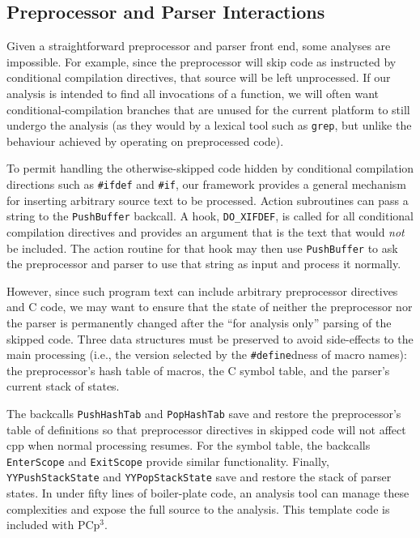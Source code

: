 \documentclass{article}
\newcommand{\pcp}{\mbox{\textsf{PCp}$^3$}}
\newcommand{\Cpp}{\mbox{\textsf{cpp}}}
\newcommand{\C}{\mbox{C}}
\newcommand{\ppd}[1]{\texttt{\##1}}
\newcommand{\ie}{i.e.,}
\begin{document}
\subsection*{Preprocessor and Parser Interactions}
\label{sec:interactions}

Given a straightforward preprocessor and parser front end, some analyses
are impossible.  For example, since the preprocessor will skip code as
instructed by conditional compilation directives, that source will be
left unprocessed. If our analysis is intended to find all invocations
of a function, we will often want conditional-compilation branches that
are unused for the current platform to still undergo the analysis (as
they would by a lexical tool such as \texttt{grep}, but unlike the
behaviour achieved by operating on preprocessed code).

To permit handling the otherwise-skipped code hidden by conditional
compilation directions such as \ppd{ifdef} and \ppd{if}, our framework
provides a general mechanism for inserting arbitrary source text to be
processed.  Action subroutines can pass a string to the \texttt{PushBuffer}
backcall.  A hook, \texttt{DO\_XIFDEF}, is called for all conditional
compilation directives and provides an argument that is the text that
would \emph{not} be included.  The action routine for that hook may then
use \texttt{PushBuffer} to ask the preprocessor and parser to use that
string as input and process it normally.

However, since such program text can include arbitrary preprocessor
directives and \C{} code, we may want to ensure that the state of
neither the preprocessor nor the parser is permanently changed after the
``for analysis only'' parsing of the skipped code.  Three data
structures must be preserved to avoid side-effects to the main
processing (\ie{} the version selected by the \ppd{define}dness of macro
names): the preprocessor's hash table of macros, the \C{} symbol table,
and the parser's current stack of states.  

The backcalls \texttt{PushHashTab} and \texttt{PopHashTab} save and
restore the preprocessor's table of definitions so that preprocessor
directives in skipped code will not affect \Cpp{} when normal processing
resumes.  For the symbol table, the backcalls \texttt{EnterScope} and
\texttt{ExitScope} provide similar functionality.  Finally,
\texttt{YYPushStackState} and \texttt{YYPopStackState} save and restore
the stack of parser states.  In under fifty lines of boiler-plate code,
an analysis tool can manage these complexities and expose the full source to
the analysis.  This template code is included with \pcp{}.
\end{document}
